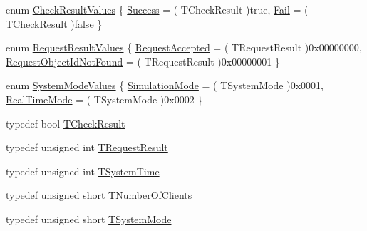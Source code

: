 \begin{DoxyCompactItemize}
\item 
enum \hyperlink{class_terra_swarm_1_1_synchronous_1_1_client_connection_response_a915e4d4af1f35e3de466d27d42c57d78}{Check\-Result\-Values} \{ \hyperlink{class_terra_swarm_1_1_synchronous_1_1_client_connection_response_a915e4d4af1f35e3de466d27d42c57d78a3a4dbed8f44a1f0abc1efe7a4ad3d5b0}{Success} = ( T\-Check\-Result )true, 
\hyperlink{class_terra_swarm_1_1_synchronous_1_1_client_connection_response_a915e4d4af1f35e3de466d27d42c57d78a085c06501e85345b78e415907a88203b}{Fail} = ( T\-Check\-Result )false
 \}
\item 
enum \hyperlink{class_terra_swarm_1_1_synchronous_1_1_client_connection_response_aab8ffc2f078549c994416633d0aa8fb8}{Request\-Result\-Values} \{ \hyperlink{class_terra_swarm_1_1_synchronous_1_1_client_connection_response_aab8ffc2f078549c994416633d0aa8fb8a25dc7f6bdc925becc175d30660c1f6ec}{Request\-Accepted} = ( T\-Request\-Result )0x00000000, 
\hyperlink{class_terra_swarm_1_1_synchronous_1_1_client_connection_response_aab8ffc2f078549c994416633d0aa8fb8a25a21c0a3a3a6d792215b28d1b566fb2}{Request\-Object\-Id\-Not\-Found} = ( T\-Request\-Result )0x00000001
 \}
\item 
enum \hyperlink{class_terra_swarm_1_1_synchronous_1_1_client_connection_response_a4aacecf0e8e3829b1de3197919a1e60a}{System\-Mode\-Values} \{ \hyperlink{class_terra_swarm_1_1_synchronous_1_1_client_connection_response_a4aacecf0e8e3829b1de3197919a1e60aaa5129160fa9b512de957c03f99faa3f9}{Simulation\-Mode} = ( T\-System\-Mode )0x0001, 
\hyperlink{class_terra_swarm_1_1_synchronous_1_1_client_connection_response_a4aacecf0e8e3829b1de3197919a1e60aaa62f96af700b98db3f35ea6885a541a3}{Real\-Time\-Mode} = ( T\-System\-Mode )0x0002
 \}
\item 
typedef bool \hyperlink{class_terra_swarm_1_1_synchronous_1_1_client_connection_response_a33254e9e1216ca2dde89b8a66f7ad18e}{T\-Check\-Result}
\item 
typedef unsigned int \hyperlink{class_terra_swarm_1_1_synchronous_1_1_client_connection_response_a4b55c1f852e288564e5aa00e882f80d5}{T\-Request\-Result}
\item 
typedef unsigned int \hyperlink{class_terra_swarm_1_1_synchronous_1_1_client_connection_response_a7b389f7e89631ce7c758c3a26c46c303}{T\-System\-Time}
\item 
typedef unsigned short \hyperlink{class_terra_swarm_1_1_synchronous_1_1_client_connection_response_adc391c9557f0acfdb0763043058cdf83}{T\-Number\-Of\-Clients}
\item 
typedef unsigned short \hyperlink{class_terra_swarm_1_1_synchronous_1_1_client_connection_response_a828bc4f350b4f661c541d988c79f05e9}{T\-System\-Mode}
\end{DoxyCompactItemize}
